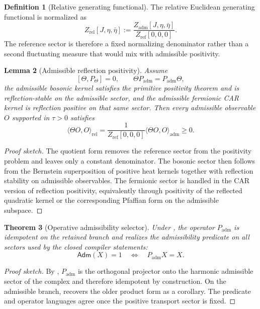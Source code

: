 \documentclass[11pt,a4paper]{article}
\newtheorem{theorem}{Theorem}[section]
\newtheorem{lemma}[theorem]{Lemma}
\theoremstyle{definition}
\newtheorem{definition}[theorem]{Definition}
\theoremstyle{remark}
\newcommand{\Padm}{P_{\mathrm{adm}}}
\begin{document}
\begin{definition}[Relative generating functional]
\label{def:relative-generating-functional}
The relative Euclidean generating functional is normalized as
\[
Z_{\mathrm{rel}}[J,\eta,\bar\eta]
:=
\frac{Z_{\mathrm{adm}}[J,\eta,\bar\eta]}{Z_{\mathrm{ref}}[0,0,0]}.
\]
The reference sector is therefore a fixed normalizing denominator rather than a second fluctuating measure that would mix with admissible positivity.
\end{definition}

\begin{lemma}[Admissible reflection positivity]
\label{lem:admissible-reflection-positivity}
Assume
\[
[\Theta,P_\Theta]=0,
\qquad
\Theta\Padm=\Padm\Theta,
\]
the admissible bosonic kernel satisfies the primitive positivity theorem
 and is reflection-stable on the admissible sector, and the
admissible fermionic CAR kernel is reflection positive on that same sector. Then every
admissible observable $O$ supported in $\tau>0$ satisfies
\[
\langle \Theta O,O\rangle_{\mathrm{rel}}
=
\frac{1}{Z_{\mathrm{ref}}[0,0,0]}
\langle \Theta O,O\rangle_{\mathrm{adm}}
\ge 0.
\]
\end{lemma}

\begin{proof}[Proof sketch]
The quotient form  removes the reference sector from the positivity problem and leaves only a constant denominator. The bosonic sector then follows from the Bernstein superposition of positive heat kernels together with reflection stability on admissible observables. The fermionic sector is handled in the CAR version of reflection positivity, equivalently through positivity of the reflected quadratic kernel or the corresponding Pfaffian form on the admissible subspace.
\end{proof}

\begin{theorem}[Operative admissibility selector]
Under , the operator $\Padm$ is idempotent on the retained branch and realizes the admissibility predicate on all sectors used by the closed compiler statements:
\[
\mathsf{Adm}(X)=1
\quad\Longleftrightarrow\quad
\Padm X = X.
\]
\end{theorem}

\begin{proof}[Proof sketch]
By , $\Padm$ is the orthogonal projector onto the
harmonic admissible sector of the complex and therefore idempotent by construction. On the
admissible branch,  recovers the older product form
as a corollary. The predicate and operator languages agree once the positive transport sector is
fixed.
\end{proof}
\end{document}
